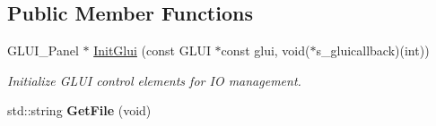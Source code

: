 \subsection*{Public Member Functions}
\begin{DoxyCompactItemize}
\item 
G\+L\+U\+I\+\_\+\+Panel $\ast$ \hyperlink{classimage__tools_1_1MIAIOManager_a02267caa7b3b9746d45e5f89138c1376}{Init\+Glui} (const G\+L\+UI $\ast$const glui, void($\ast$s\+\_\+gluicallback)(int))
\begin{DoxyCompactList}\small\item\em Initialize G\+L\+UI control elements for IO management. \end{DoxyCompactList}\item 
std\+::string {\bfseries Get\+File} (void)\hypertarget{classimage__tools_1_1MIAIOManager_afd9bf4031933ced4273132d1ffdf4d76}{}\label{classimage__tools_1_1MIAIOManager_afd9bf4031933ced4273132d1ffdf4d76}


\end{DoxyCompactItemize}
